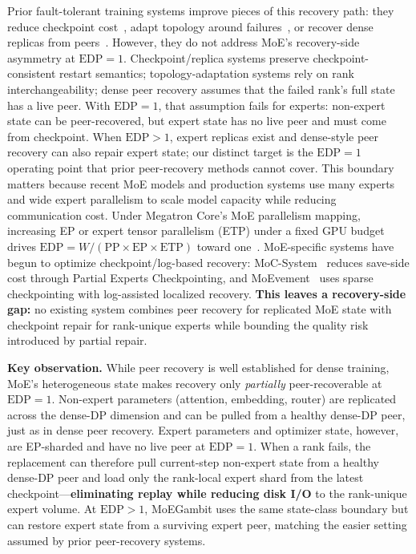 \documentclass[10pt,conference]{IEEEtran}
\begin{document}
Prior fault-tolerant training systems improve pieces of this recovery path: they reduce checkpoint cost~\cite{mohan2021checkfreq,nicolae2020deepfreeze,eisenman2022check,wang2023gemini,wang2024reft,wan2024bytecheckpoint}, adapt topology around failures~\cite{thorpe2023bamboo,jang2023oobleck,gandhi2024recycle}, or recover dense replicas from peers~\cite{zhang2025flashrecovery}. However, they do not address MoE's recovery-side asymmetry at $\text{EDP}=1$. Checkpoint/replica systems preserve checkpoint-consistent restart semantics; topology-adaptation systems rely on rank interchangeability; dense peer recovery assumes that the failed rank's full state has a live peer. With $\text{EDP}=1$, that assumption fails for experts: non-expert state can be peer-recovered, but expert state has no live peer and must come from checkpoint. When $\text{EDP}>1$, expert replicas exist and dense-style peer recovery can also repair expert state; our distinct target is the $\text{EDP}=1$ operating point that prior peer-recovery methods cannot cover. This boundary matters because recent MoE models and production systems use many experts and wide expert parallelism to scale model capacity while reducing communication cost. Under Megatron Core's MoE parallelism mapping, increasing EP or expert tensor parallelism (ETP) under a fixed GPU budget drives $\text{EDP}=W/(\text{PP}\times\text{EP}\times\text{ETP})$ toward one~\cite{deepseekv3,qwen3report,jin2025megascale_moe,yan2026megatroncore}. MoE-specific systems have begun to optimize checkpoint/log-based recovery: MoC-System~\cite{cai2024moc} reduces save-side cost through Partial Experts Checkpointing, and MoEvement~\cite{gandhi2026moevement} uses sparse checkpointing with log-assisted localized recovery. \textbf{This leaves a recovery-side gap:} no existing system combines peer recovery for replicated MoE state with checkpoint repair for rank-unique experts while bounding the quality risk introduced by partial repair.

\textbf{Key observation.} While peer recovery is well established for dense training, MoE's heterogeneous state makes recovery only \emph{partially} peer-recoverable at $\text{EDP}=1$. Non-expert parameters (attention, embedding, router) are replicated across the dense-DP dimension and can be pulled from a healthy dense-DP peer, just as in dense peer recovery. Expert parameters and optimizer state, however, are EP-sharded and have no live peer at $\text{EDP}=1$. When a rank fails, the replacement can therefore pull current-step non-expert state from a healthy dense-DP peer and load only the rank-local expert shard from the latest checkpoint---\textbf{eliminating replay while reducing disk I/O} to the rank-unique expert volume. At $\text{EDP}>1$, MoEGambit uses the same state-class boundary but can restore expert state from a surviving expert peer, matching the easier setting assumed by prior peer-recovery systems.
\end{document}
